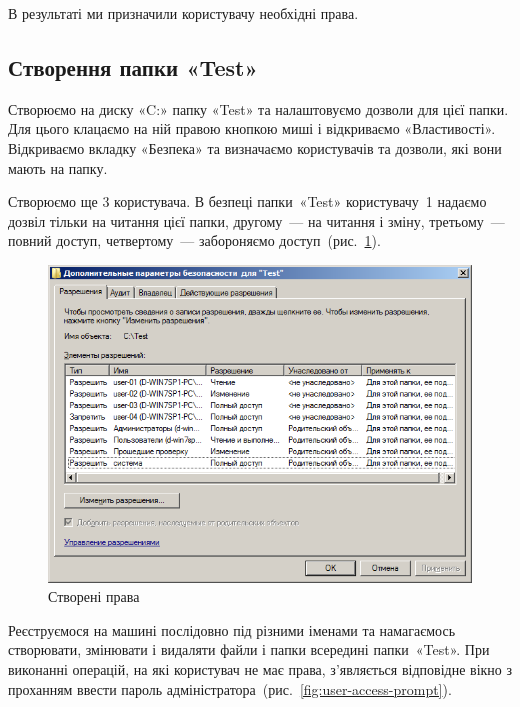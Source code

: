 \documentclass[
	a4paper,
	oneside,
	DIV = 12,
	fontsize = 13pt,
	headings = normal,
]{scrartcl}
\begin{document}
			В результаті ми призначили користувачу необхідні права.

		\subsection{Створення папки «\textenglish{Test}»}
			Створюємо на диску «\textenglish{C:}» папку «\textenglish{Test}» та налаштовуємо дозволи для цієї папки. Для цього клацаємо на ній правою кнопкою миші і відкриваємо «Властивості». Відкриваємо вкладку «Безпека» та визначаємо користувачів та дозволи, які вони мають на папку.

			Створюємо ще 3 користувача. В безпеці папки~«\textenglish{Test}» користувачу~1 надаємо дозвіл тільки на читання цієї папки, другому~— на читання і зміну, третьому~— повний доступ, четвертому~— забороняємо доступ~(рис.~\ref{fig:created-user-rights}).

			\begin{figure}[!htbp]
				\centering
				\includegraphics[height = 9\baselineskip]{../01-solution/y03s01-pcdiag-lab-08-p12.png}
				\caption{Створені права}
				\label{fig:created-user-rights}
			\end{figure}

			Реєструємося на машині послідовно під різними іменами та намагаємось створювати, змінювати і видаляти файли і папки всередині папки~«\textenglish{Test}». При виконанні операцій, на які користувач не має права, з'являється відповідне вікно з проханням ввести пароль адміністратора~(рис.~\ref{fig:user-access-prompt}).
\end{document}
